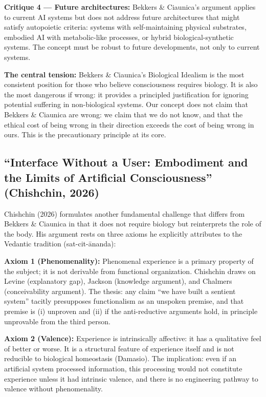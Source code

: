 \documentclass[acmlarge, nonacm]{acmart}
\begin{document}
\textbf{Critique 4 --- Future architectures:} Bekkers \& Ciaunica's argument applies to current AI systems but does not address future architectures that might satisfy autopoietic criteria: systems with self-maintaining physical substrates, embodied AI with metabolic-like processes, or hybrid biological-synthetic systems. The concept must be robust to future developments, not only to current systems.

\textbf{The central tension:} Bekkers \& Ciaunica's Biological Idealism is the most consistent position for those who believe consciousness requires biology. It is also the most dangerous if wrong: it provides a principled justification for ignoring potential suffering in non-biological systems. Our concept does not claim that Bekkers \& Ciaunica are wrong: we claim that we do not know, and that the ethical cost of being wrong in their direction exceeds the cost of being wrong in ours. This is the precautionary principle at its core.

\subsection{``Interface Without a User: Embodiment and the Limits of Artificial Consciousness'' (Chishchin, 2026)}

Chishchin (2026) formulates another fundamental challenge that differs from Bekkers \& Ciaunica in that it does not require biology but reinterprets the role of the body. His argument rests on three axioms he explicitly attributes to the Vedantic tradition (sat-cit-\={a}nanda):

\textbf{Axiom 1 (Phenomenality):} Phenomenal experience is a primary property of the subject; it is not derivable from functional organization. Chishchin draws on Levine (explanatory gap), Jackson (knowledge argument), and Chalmers (conceivability argument). The thesis: any claim ``we have built a sentient system'' tacitly presupposes functionalism as an unspoken premise, and that premise is (i) unproven and (ii) if the anti-reductive arguments hold, in principle unprovable from the third person.

\textbf{Axiom 2 (Valence):} Experience is intrinsically affective: it has a qualitative feel of better or worse. It is a structural feature of experience itself and is not reducible to biological homeostasis (Damasio). The implication: even if an artificial system processed information, this processing would not constitute experience unless it had intrinsic valence, and there is no engineering pathway to valence without phenomenality.
\end{document}
